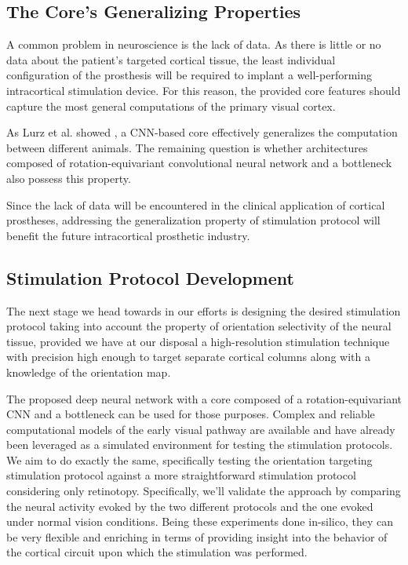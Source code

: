 \subsection*{The Core’s Generalizing Properties}

A common problem in neuroscience is the lack of data. As there is little or no data about the patient’s targeted cortical tissue, the least individual configuration of the prosthesis will be required to implant a well-performing intracortical stimulation device. For this reason, the provided core features should capture the most general computations of the primary visual cortex.

As Lurz et al. showed \citep{lurz2021generalization}, a CNN-based core effectively generalizes the computation between different animals. The remaining question is whether architectures composed of rotation-equivariant convolutional neural network and a bottleneck also possess this property.

Since the lack of data will be encountered in the clinical application of cortical prostheses, addressing the generalization property of stimulation protocol will benefit the future intracortical prosthetic industry.


\subsection*{Stimulation Protocol Development}

The next stage we head towards in our efforts is designing the desired stimulation protocol taking into account the property of orientation selectivity of the neural tissue, provided we have at our disposal a high-resolution stimulation technique with precision high enough to target separate cortical columns along with a knowledge of the orientation map. 

The proposed deep neural network with a core composed of a rotation-equivariant CNN and a bottleneck can be used for those purposes. Complex and reliable computational models of the early visual pathway are available \citep{antolik2021assessment} and have already been leveraged as a simulated environment for testing the stimulation protocols. We aim to do exactly the same, specifically testing the orientation targeting stimulation protocol against a more straightforward stimulation protocol considering only retinotopy. Specifically, we’ll validate the approach by comparing the neural activity evoked by the two different protocols and the one evoked under normal vision conditions. Being these experiments done in-silico, they can be very flexible and enriching in terms of providing insight into the behavior of the cortical circuit upon which the stimulation was performed.

